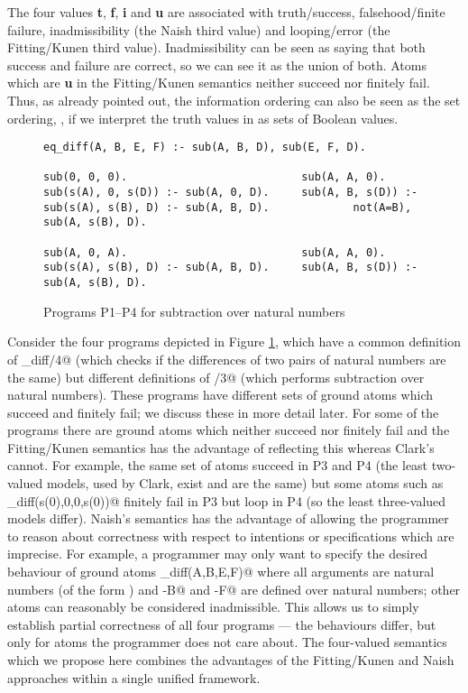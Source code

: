 \documentclass{tlp}
\begin{document}
The four values \textbf{t}, \textbf{f}, \textbf{i} and \textbf{u} are
associated with truth/success, falsehood/finite failure, inadmissibility
(the Naish third value) and looping/error (the Fitting/Kunen third value).
Inadmissibility can be seen as saying that both success and failure are
correct, so we can see it as the union of both.  Atoms which are
\textbf{u} in the Fitting/Kunen semantics neither succeed nor finitely fail.  
Thus, as already pointed out,
the information ordering can also be seen as the
set ordering, , if we interpret the truth values in 
as sets of Boolean values.  

\begin{figure}
\begin{verbatim}
eq_diff(A, B, E, F) :- sub(A, B, D), sub(E, F, D).

sub(0, 0, 0).                           sub(A, A, 0).
sub(s(A), 0, s(D)) :- sub(A, 0, D).     sub(A, B, s(D)) :-
sub(s(A), s(B), D) :- sub(A, B, D).             not(A=B), sub(A, s(B), D).

sub(A, 0, A).                           sub(A, A, 0).
sub(s(A), s(B), D) :- sub(A, B, D).     sub(A, B, s(D)) :- sub(A, s(B), D).
\end{verbatim}
\caption{Programs P1--P4 for subtraction over natural numbers}
\label{fig-sub}
\end{figure}

Consider the four programs depicted in Figure \ref{fig-sub}, which have
a common definition of \verb@eq_diff/4@ (which checks if the differences
of two pairs of natural numbers are the same) but different definitions
of \verb@sub/3@ (which performs subtraction over
natural numbers).  These programs have different sets of ground atoms which
succeed and finitely fail; we discuss these in more detail
later.  For some of the programs there are ground atoms
which neither succeed nor finitely fail and the Fitting/Kunen semantics
has the advantage of reflecting this whereas Clark's
cannot.  For example, the same set of atoms succeed in P3 and P4
(the least two-valued models, used by Clark, exist and are the same) but
some atoms such as \verb@eq_diff(s(0),0,0,s(0))@ finitely fail in P3
but loop in P4 (so the least three-valued models differ).  Naish's
semantics has the advantage of allowing the programmer to reason about
correctness with respect to intentions or specifications which are
imprecise.  For example, a programmer may only want to specify the
desired behaviour of ground atoms \verb@eq_diff(A,B,E,F)@ where all
arguments are natural numbers (of the form ) and \verb@A-B@ and
\verb@E-F@ are defined over natural numbers; other atoms can reasonably
be considered inadmissible. This allows us to simply establish partial
correctness of all four programs --- the behaviours differ, but only
for atoms the programmer does not care about.  The four-valued semantics
which we propose here combines the advantages of the Fitting/Kunen and
Naish approaches within a single unified framework.
\end{document}

